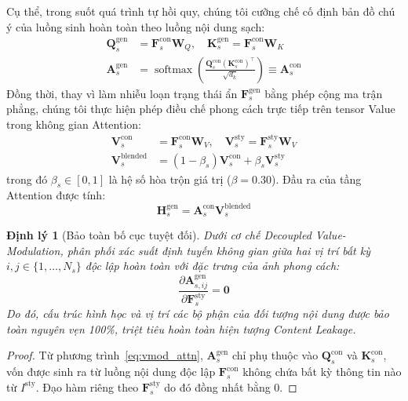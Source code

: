 \documentclass[10pt,twocolumn,letterpaper]{article}
\newtheorem{theorem}{Định lý}
\begin{document}
Cụ thể, trong suốt quá trình tự hồi quy, chúng tôi cưỡng chế cố định bản đồ chú ý của luồng sinh hoàn toàn theo luồng nội dung sạch:
\begin{align}
\mathbf{Q}_s^{\text{gen}} &= \mathbf{F}_s^{\text{con}} \mathbf{W}_Q, \quad \mathbf{K}_s^{\text{gen}} = \mathbf{F}_s^{\text{con}} \mathbf{W}_K \\
\mathbf{A}_s^{\text{gen}} &= \operatorname{softmax}\left(\frac{\mathbf{Q}_s^{\text{con}} (\mathbf{K}_s^{\text{con}})^\top}{\sqrt{d_k}}\right) \equiv \mathbf{A}_s^{\text{con}} \label{eq:vmod_attn}
\end{align}
Đồng thời, thay vì làm nhiễu loạn trạng thái ẩn $\mathbf{F}_s^{\text{gen}}$ bằng phép cộng ma trận phẳng, chúng tôi thực hiện phép điều chế phong cách trực tiếp trên tensor Value trong không gian Attention:
\begin{align}
\mathbf{V}_s^{\text{con}} &= \mathbf{F}_s^{\text{con}} \mathbf{W}_V, \quad \mathbf{V}_s^{\text{sty}} = \mathbf{F}_s^{\text{sty}} \mathbf{W}_V \\
\mathbf{V}_s^{\text{blended}} &= (1 - \beta_s) \mathbf{V}_s^{\text{con}} + \beta_s \mathbf{V}_s^{\text{sty}} \label{eq:vmod_blend}
\end{align}
trong đó $\beta_s \in [0, 1]$ là hệ số hòa trộn giá trị ($\beta = 0.30$). Đầu ra của tầng Attention được tính:
\begin{equation}
\mathbf{H}_s^{\text{gen}} = \mathbf{A}_s^{\text{con}} \mathbf{V}_s^{\text{blended}} \label{eq:vmod_out}
\end{equation}

\begin{theorem}[Bảo toàn bố cục tuyệt đối]
\label{thm:zero_leakage}
Dưới cơ chế Decoupled Value-Modulation, phân phối xác suất định tuyến không gian giữa hai vị trí bất kỳ $i, j \in \{1, \dots, N_s\}$ độc lập hoàn toàn với đặc trưng của ảnh phong cách:
\begin{equation}
\frac{\partial \mathbf{A}_{s, ij}^{\text{gen}}}{\partial \mathbf{F}_s^{\text{sty}}} = \mathbf{0}
\end{equation}
Do đó, cấu trúc hình học và vị trí các bộ phận của đối tượng nội dung được bảo toàn nguyên vẹn 100\%, triệt tiêu hoàn toàn hiện tượng Content Leakage.
\end{theorem}
\begin{proof}
Từ phương trình~\eqref{eq:vmod_attn}, $\mathbf{A}_s^{\text{gen}}$ chỉ phụ thuộc vào $\mathbf{Q}_s^{\text{con}}$ và $\mathbf{K}_s^{\text{con}}$, vốn được sinh ra từ luồng nội dung độc lập $\mathbf{F}_s^{\text{con}}$ không chứa bất kỳ thông tin nào từ $I^{\text{sty}}$. Đạo hàm riêng theo $\mathbf{F}_s^{\text{sty}}$ do đó đồng nhất bằng 0.
\end{proof}
\end{document}
